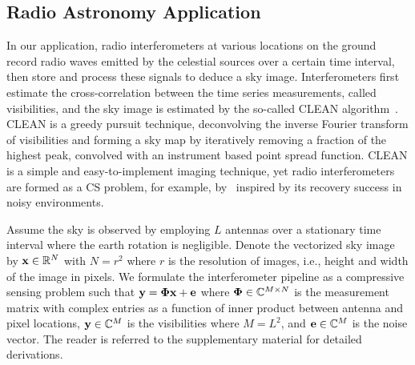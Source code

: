 \documentclass{article}
\begin{document}
\subsection{Radio Astronomy Application}

In our application, radio interferometers at various locations on the ground record radio waves emitted by the celestial sources over a certain time interval, then store and process these signals to deduce a sky image. Interferometers first estimate the cross-correlation between the time series measurements, called visibilities, and the sky image is estimated by the so-called {CLEAN} algorithm~\cite{hogbom1974clean}. {CLEAN} is a greedy pursuit technique, deconvolving the inverse Fourier transform of visibilities and forming a sky map by iteratively removing a fraction of the highest peak, convolved with an instrument based point spread function. CLEAN is a simple and easy-to-implement imaging technique, yet radio interferometers are formed as a CS problem, for example, by~\cite{wiaux2009csforra, wenger2010csforra, li2011deconvolution} inspired by its recovery success in noisy environments.

Assume the sky is observed by employing $L$ antennas over a stationary time interval where the earth rotation is negligible. Denote the vectorized sky image by ${\bf x} \in \mathbb{R}^N$ with $N = {r^2}$ where $r$ is the resolution of images, i.e., height and width of the image in pixels. We formulate the interferometer pipeline as a compressive sensing problem such that ${\bf y} = {\bf \Phi} {\bf x} + {\bf e}$ where ${\bf \Phi} \in \mathbb{C}^{M\times N}$ is the measurement matrix with complex entries as a function of inner product between antenna and pixel locations, ${\bf y} \in \mathbb{C}^{M}$ is the visibilities where $M=L^2$, and ${\bf e} \in \mathbb{C}^M$ is the noise vector. The reader is referred to the supplementary material for detailed derivations. 
\end{document}
